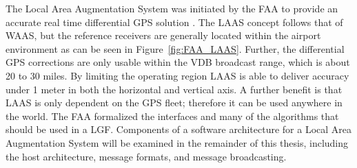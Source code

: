 The Local Area Augmentation System was initiated by the FAA to provide an accurate real time differential GPS solution . The LAAS concept follows that of WAAS, but the reference receivers are generally located within the airport environment as can be seen in Figure~\ref{fig:FAA_LAAS}.  Further, the differential GPS corrections are only usable within the VDB broadcast range, which is about 20 to 30 miles.  By limiting the operating region LAAS is able to deliver accuracy under 1 meter in both the horizontal and vertical axis\cite[]{FAA_LAAS}. A further benefit is that LAAS is only dependent on the GPS fleet; therefore it can be used anywhere in the world.  The FAA formalized the interfaces and many of the algorithms that should be used in a LGF. Components of a software architecture for a Local Area Augmentation System will be examined in the remainder of this thesis, including the host architecture, message formats, and message broadcasting.

